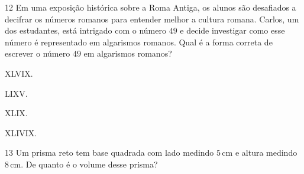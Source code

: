 \num{12} Em uma exposição histórica sobre a Roma Antiga, os alunos são desafiados
a decifrar os números romanos para entender melhor a cultura romana. Carlos, um
dos estudantes, está intrigado com o número $49$ e decide investigar como esse
número é representado em algarismos romanos. Qual é a forma correta de escrever
o número $49$ em algarismos romanos?

\begin{escolha}
\item XLVIX.

\item LIXV.

\item XLIX.

\item XLIVIX.
\end{escolha}



\num{13} Um prisma reto tem base quadrada com lado medindo $5\,\text{cm}$ e altura
medindo $8\,\text{cm}$. De quanto é o volume desse prisma?

